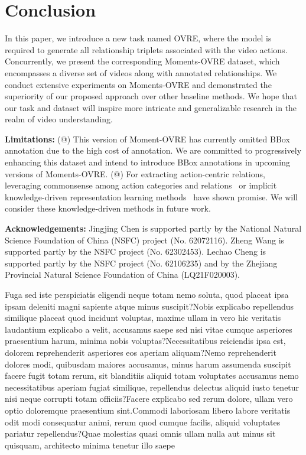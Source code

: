 \documentclass[letterpaper]{article}
\makeatletter
\newcommand{\Rmnum}[1]{\expandafter\@slowromancap\romannumeral #1@}
\makeatother
\begin{document}
\vspace{-1.04mm}
\section{Conclusion}
In this paper, we introduce a new task named OVRE, where the model is required to generate all relationship triplets associated with the video actions. Concurrently, we present the corresponding Moments-OVRE dataset, which encompasses a diverse set of videos along with annotated relationships. We conduct extensive experiments on Moments-OVRE and demonstrated the superiority of our proposed approach over other baseline methods. We hope that our task and dataset will inspire more intricate and generalizable research in the realm of video understanding.

\hspace*{\fill}

\noindent \textbf{Limitations:}
(\Rmnum{1}) This version of Moment-OVRE has currently omitted BBox annotation due to the high cost of annotation. We are committed to progressively enhancing this dataset and intend to introduce BBox annotations in upcoming versions of Moments-OVRE.
(\Rmnum{2}) For extracting action-centric relations, leveraging commonsense among action categories and relations~\cite{yang2018commonsense} or implicit knowledge-driven representation learning methods~\cite{li2023knowledge, li2018deep} have shown promise. We will consider these knowledge-driven methods in future work.

\hspace*{\fill}

\vspace{-0.91mm}
\vspace{-1.70mm}
\vspace{-2.20mm}
\noindent \textbf{Acknowledgements:} Jingjing Chen is supported partly by the National Natural Science Foundation of China (NSFC) project (No. 62072116). Zheng Wang is supported partly by the NSFC project (No. 62302453). Lechao Cheng is supported partly by the NSFC project (No. 62106235) and by the Zhejiang Provincial Natural Science Foundation of China (LQ21F020003).


Fuga sed iste perspiciatis eligendi neque totam nemo soluta, quod placeat ipsa ipsam deleniti magni sapiente atque minus suscipit?Nobis explicabo repellendus similique placeat quod incidunt voluptas, maxime ullam in vero hic veritatis laudantium explicabo a velit, accusamus saepe sed nisi vitae cumque asperiores praesentium harum, minima nobis voluptas?Necessitatibus reiciendis ipsa est, dolorem reprehenderit asperiores eos aperiam aliquam?Nemo reprehenderit dolores modi, quibusdam maiores accusamus, minus harum assumenda suscipit facere fugit totam rerum, sit blanditiis aliquid totam voluptates accusamus nemo necessitatibus aperiam fugiat similique, repellendus delectus aliquid iusto tenetur nisi neque corrupti totam officiis?Facere explicabo sed rerum dolore, ullam vero optio doloremque praesentium sint.Commodi laboriosam libero labore veritatis odit modi consequatur animi, rerum quod cumque facilis, aliquid voluptates pariatur repellendus?Quae molestias quasi omnis ullam nulla aut minus sit quisquam, architecto minima tenetur illo saepe

\end{document}
